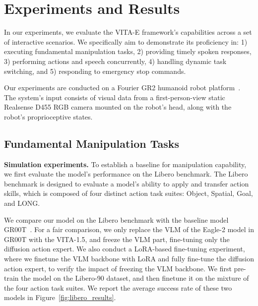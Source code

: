 \section{Experiments and Results}
\label{sec:experiments}

In our experiments, we evaluate the VITA-E framework's capabilities across a set of interactive scenarios. We specifically aim to demonstrate its proficiency in: 1) executing fundamental manipulation tasks, 2) providing timely spoken responses, 3) performing actions and speech concurrently, 4) handling dynamic task switching, and 5) responding to emergency stop commands. 

Our experiments are conducted on a Fourier GR2 humanoid robot platform~\citep{FourierGR2}. The system's input consists of visual data from a first-person-view static Realsense D455 RGB camera mounted on the robot's head, along with the robot's proprioceptive states.

\subsection{Fundamental Manipulation Tasks}

\textbf{Simulation experiments.} To establish a baseline for manipulation capability, we first evaluate the model's performance on the Libero benchmark. The Libero benchmark is designed to evaluate a model's ability to apply and transfer action skills, which is composed of four distinct action task suites: Object, Spatial, Goal, and LONG.

We compare our model on the Libero benchmark with the baseline model GR00T~\citep{gr00t}. For a fair comparison, we only replace the VLM of the Eagle-2 model in GR00T with the VITA-1.5, and freeze the VLM part, fine-tuning only the diffusion action expert. We also conduct a LoRA-based fine-tuning experiment, where we finetune the VLM backbone with LoRA and fully fine-tune the diffusion action expert, to verify the impact of freezing the VLM backbone. We first pre-train the model on the Libero-90 dataset, and then finetune it on the mixture of the four action task suites. We report the average success rate of these two models in Figure~\ref{fig:libero_results}.

